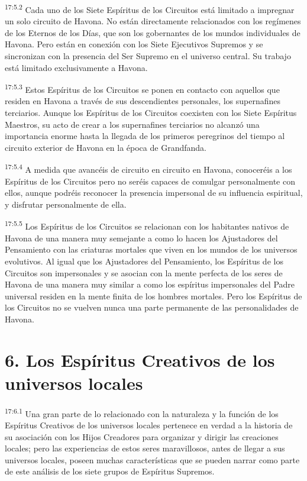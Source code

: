 \par
\textsuperscript{17:5.2} Cada uno de los Siete Espíritus de los Circuitos está limitado a impregnar un solo circuito de Havona. No están directamente relacionados con los regímenes de los Eternos de los Días, que son los gobernantes de los mundos individuales de Havona. Pero están en conexión con los Siete Ejecutivos Supremos y se sincronizan con la presencia del Ser Supremo en el universo central. Su trabajo está limitado exclusivamente a Havona.

\par
\textsuperscript{17:5.3} Estos Espíritus de los Circuitos se ponen en contacto con aquellos que residen en Havona a través de sus descendientes personales, los supernafines terciarios. Aunque los Espíritus de los Circuitos coexisten con los Siete Espíritus Maestros, su acto de crear a los supernafines terciarios no alcanzó una importancia enorme hasta la llegada de los primeros peregrinos del tiempo al circuito exterior de Havona en la época de Grandfanda.

\par
\textsuperscript{17:5.4} A medida que avancéis de circuito en circuito en Havona, conoceréis a los Espíritus de los Circuitos pero no seréis capaces de comulgar personalmente con ellos, aunque podréis reconocer la presencia impersonal de su influencia espiritual, y disfrutar personalmente de ella.

\par
\textsuperscript{17:5.5} Los Espíritus de los Circuitos se relacionan con los habitantes nativos de Havona de una manera muy semejante a como lo hacen los Ajustadores del Pensamiento con las criaturas mortales que viven en los mundos de los universos evolutivos. Al igual que los Ajustadores del Pensamiento, los Espíritus de los Circuitos son impersonales y se asocian con la mente perfecta de los seres de Havona de una manera muy similar a como los espíritus impersonales del Padre universal residen en la mente finita de los hombres mortales. Pero los Espíritus de los Circuitos no se vuelven nunca una parte permanente de las personalidades de Havona.

\section*{6. Los Espíritus Creativos de los universos locales}
\par
\textsuperscript{17:6.1} Una gran parte de lo relacionado con la naturaleza y la función de los Espíritus Creativos de los universos locales pertenece en verdad a la historia de su asociación con los Hijos Creadores para organizar y dirigir las creaciones locales; pero las experiencias de estos seres maravillosos, antes de llegar a sus universos locales, poseen muchas características que se pueden narrar como parte de este análisis de los siete grupos de Espíritus Supremos.

